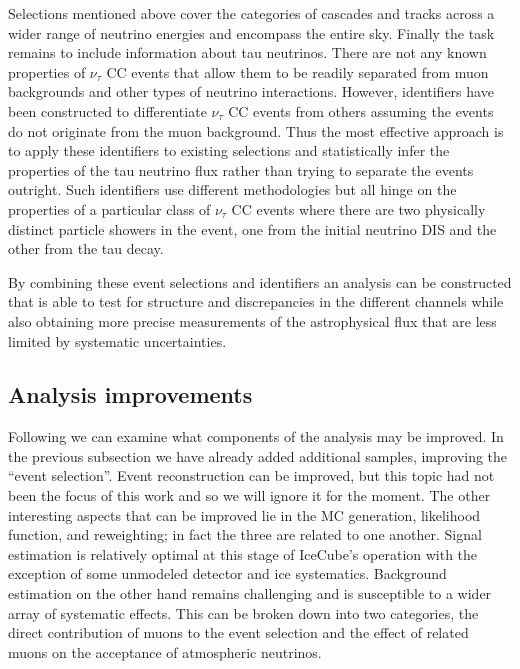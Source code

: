 Selections mentioned above cover the categories of cascades and tracks across a wider range of neutrino energies and encompass the entire sky.
Finally the task remains to include information about tau neutrinos.
There are not any known properties of $\nu_\tau$ CC events that allow them to be readily separated from muon backgrounds and other types of neutrino interactions.
However, identifiers have been constructed to differentiate $\nu_\tau$ CC events from others assuming the events do not originate from the muon background.
Thus the most effective approach is to apply these identifiers to existing selections and statistically infer the properties of the tau neutrino flux rather than trying to separate the events outright.
Such identifiers use different methodologies but all hinge on the properties of a particular class of $\nu_\tau$ CC events where there are two physically distinct particle showers in the event, one from the initial neutrino DIS and the other from the tau decay.

By combining these event selections and identifiers an analysis can be constructed that is able to test for structure and discrepancies in the different channels while also obtaining more precise measurements of the astrophysical flux that are less limited by systematic uncertainties.

\subsection{Analysis improvements}
Following  we can examine what components of the analysis may be improved.
In the previous subsection we have already added additional samples, improving the ``event selection''.
Event reconstruction can be improved, but this topic had not been the focus of this work and so we will ignore it for the moment.
The other interesting aspects that can be improved lie in the MC generation, likelihood function, and reweighting; in fact the three are related to one another.
Signal estimation is relatively optimal at this stage of IceCube's operation with the exception of some unmodeled detector and ice systematics.
Background estimation on the other hand remains challenging and is susceptible to a wider array of systematic effects.
This can be broken down into two categories, the direct contribution of muons to the event selection and the effect of related muons on the acceptance of atmospheric neutrinos.

